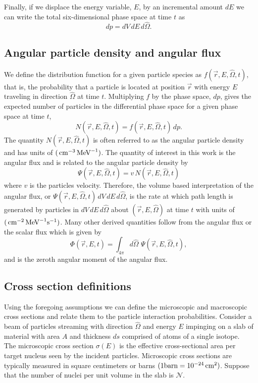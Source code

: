 Finally, if we displace the energy variable, $E$, by an incremental amount $dE$ we can write the total six-dimensional phase space at time $t$ as
\begin{equation}
  dp = dV \, dE \, d\hat{\Omega}.
\end{equation}

\subsection{Angular particle density and angular flux}
We define the distribution function for a given particle species as $f(\vec{r},E,\hat{\Omega},t)$, that is, the probability that a particle is located at position $\vec{r}$ with energy $E$ traveling in direction $\hat{\Omega}$ at time $t$. Multiplying $f$ by the phase space, $dp$, gives the expected number of particles in the differential phase space for a given phase space at time $t$,
\begin{equation}
  N(\vec{r},E,\hat{\Omega},t) = f(\vec{r},E,\hat{\Omega},t) \, dp.
\end{equation}
The quantity $N(\vec{r},E,\hat{\Omega},t)$ is often referred to as the angular particle density and has units of $(\,\text{cm}^{-3} \,\text{MeV}^{-1})$. The quantity of interest in this work is the angular flux and is related to the angular particle density by 
\begin{equation}
  \Psi(\vec{r},E,\hat{\Omega},t) = v \, N(\vec{r},E,\hat{\Omega},t)
\end{equation}
where $v$ is the particles velocity.
Therefore, the volume based interpretation of the angular flux, or $\Psi(\vec{r},E,\hat{\Omega},t) \,dV\,dE\,d\hat{\Omega}$, is the rate at which path length is generated by particles in $dV\,dE\,d\hat{\Omega}$ about $(\vec{r}, E, \hat{\Omega})$ at time $t$ with units of $(\,\text{cm}^{-2} \,\text{MeV}^{-1} \text{s}^{-1})$. Many other derived quantities follow from the angular flux or the scalar flux which is given by
\begin{equation}
  \Phi(\vec{r},E,t) = \int_{4\pi} d \hat{\Omega} \,\, \Psi(\vec{r},E,\hat{\Omega},t),
\end{equation}
and is the zeroth angular moment of the angular flux.

\subsection{Cross section definitions}
Using the foregoing assumptions we can define the microscopic and macroscopic cross sections and relate them to the particle interaction probabilities. Consider a beam of particles streaming with direction $\hat{\Omega}$ and energy $E$ impinging on a slab of material with area $A$ and thickness $ds$ comprised of atoms of a single isotope. The microscopic cross section $\sigma(E)$ is the effective cross-sectional area per target nucleus seen by the incident particles. Microscopic cross sections are typically measured in square centimeters or barns $(1 \text{barn} = 10^{-24} \,\text{cm}^2)$. Suppose that the number of nuclei per unit volume in the slab is $\mathcal{N}$. 

